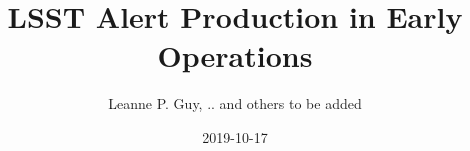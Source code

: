 \documentclass[SE,toc, lsstdraft]{lsstdoc}
\title[LOY1 Alerts]{LSST Alert Production in Early Operations}
\author{%
Leanne P. Guy, .. and others to be added
}
\date{2019-10-17}
\begin{document}
\maketitle




\appendix


\label{sec:acronyms}
\printglossaries
\end{document}
